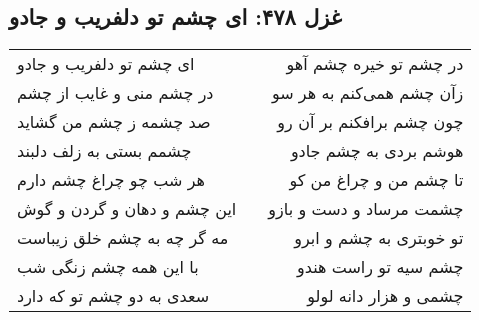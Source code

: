 \begin{center}
\section*{غزل ۴۷۸: ای چشم تو دلفریب و جادو}
\label{sec:478}
\begin{longtable}{l p{0.5cm} r}
ای چشم تو دلفریب و جادو
&&
در چشم تو خیره چشم آهو
\\
در چشم منی و غایب از چشم
&&
زآن چشم همی‌کنم به هر سو
\\
صد چشمه ز چشم من گشاید
&&
چون چشم برافکنم بر آن رو
\\
چشمم بستی به زلف دلبند
&&
هوشم بردی به چشم جادو
\\
هر شب چو چراغ چشم دارم
&&
تا چشم من و چراغ من کو
\\
این چشم و دهان و گردن و گوش
&&
چشمت مرساد و دست و بازو
\\
مه گر چه به چشم خلق زیباست
&&
تو خوبتری به چشم و ابرو
\\
با این همه چشم زنگی شب
&&
چشم سیه تو راست هندو
\\
سعدی به دو چشم تو که دارد
&&
چشمی و هزار دانه لولو
\\
\end{longtable}
\end{center}
